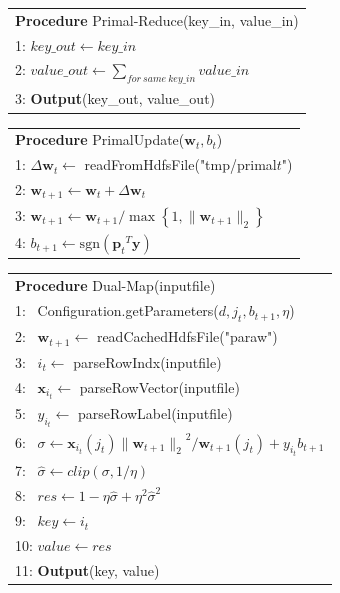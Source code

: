 \documentclass[10pt, conference, compsocconf]{IEEEtran}
\newcommand{\bw}{\mathbf{w}}
\newcommand{\bp}{\mathbf{p}}
\newcommand{\lc}{\left(}
\newcommand{\rc}{\right)}
\def\sgn{\mathrm{sgn}}
\begin{document}
    \begin{table}[ht]
	\begin{tabular}{l}
	\hline\noalign{\smallskip}
	\textbf{Procedure} Primal-Reduce(key\_in, value\_in) \\
	\noalign{\smallskip}
	\hline
	\noalign{\smallskip}
    1:  $key\_out \leftarrow key\_in$ \\
    2:  $value\_out \leftarrow \sum_{for~same~key\_in}{value\_in} $ \\
    3:  \textbf{Output}(key\_out, value\_out) \\
	\hline
	\end{tabular}
	\end{table}

    \begin{table}[ht]
	\begin{tabular}{l}
	\hline\noalign{\smallskip}
	\textbf{Procedure} PrimalUpdate($\bw_t, b_t$) \\
	\noalign{\smallskip}
	\hline
	\noalign{\smallskip}
    1:  $\Delta \bw_t \leftarrow$ readFromHdfsFile("tmp/primal$t$") \\
    2:  $\bw_{t+1} \leftarrow \bw_t+\Delta \bw_t$ \\
	3:	${\bw}_{t+1}\leftarrow {\bw}_{t+1}/\max \left\{1,\|{\bw}_{t+1}\|_2 \right\}$ \\
    4:  ${b}_{t+1}\leftarrow \sgn\lc {{\bp}_{t}}^{T}\mathbf{y}\rc$ \\
	\hline
	\end{tabular}
	\end{table}

    \begin{table}[ht]
	\begin{tabular}{l}
	\hline\noalign{\smallskip}
	\textbf{Procedure} Dual-Map(inputfile) \\
	\noalign{\smallskip}
	\hline
	\noalign{\smallskip}
    1:  ~Configuration.getParameters($d, j_t, b_{t+1}, \eta$) \\
    2:  ~$\bw_{t+1} \leftarrow$ readCachedHdfsFile("paraw") \\
    3:  ~$i_t \leftarrow$ parseRowIndx(inputfile)\\
    4:  ~$\mathbf{x}_{i_t} \leftarrow$ parseRowVector(inputfile) \\
    5:  ~$y_{i_t} \leftarrow$ parseRowLabel(inputfile) \\
    6:  ~$\sigma \leftarrow \mathbf{x}_{i_t} \lc {j}_{t}\rc{\|{\bw}_{t+1}\|_2}^{2}/{\bw}_{t+1}\lc {j}_{t} \rc+{y}_{i_t}{b}_{t+1}$ \\
	7:	~$\hat{\sigma} \leftarrow clip\lc \sigma,1/\eta \rc$ \\
	8:	~$res \leftarrow 1-\eta\hat{\sigma} + {\eta}^{2}{\hat{\sigma}}^{2} $ \\
    9:  ~$key \leftarrow i_t$ \\
    10: $value \leftarrow res $ \\
    11: \textbf{Output}(key, value) \\
	\hline
	\end{tabular}
	\end{table}
\end{document}
